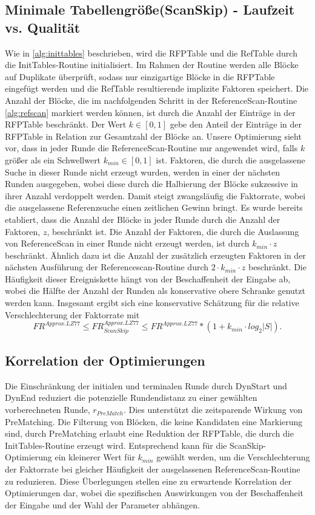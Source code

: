 \subsection{Minimale Tabellengröße(ScanSkip) - Laufzeit vs. Qualität}
Wie in \ref{alg:inittables} beschrieben, wird die RFPTable und die RefTable durch die InitTables-Routine initialisiert. Im Rahmen der Routine werden alle Blöcke auf Duplikate
überprüft, sodass nur einzigartige Blöcke in die RFPTable eingefügt werden und die RefTable resultierende implizite Faktoren speichert. Die Anzahl der Blöcke, die im nachfolgenden Schritt 
in der ReferenceScan-Routine \ref{alg:refscan} markiert werden können, ist durch die Anzahl der Einträge in der RFPTable beschränkt. Der Wert $k\in [0,1]$ gebe den Anteil der
Einträge in der RFPTable in Relation zur Gesamtzahl der Blöcke an. Unsere Optimierung sieht vor, dass in jeder Runde die ReferenceScan-Routine nur angewendet wird, falls $k$ größer
als ein Schwellwert $k_{min}\in [0,1]$ ist. Faktoren, die durch die ausgelassene Suche in dieser Runde nicht erzeugt wurden, werden in einer der nächsten Runden ausgegeben, wobei diese
durch die Halbierung der Blöcke sukzessive in ihrer Anzahl verdoppelt werden. Damit steigt zwangsläufig die Faktorrate, wobei die ausgelassene Referenzsuche einen zeitlichen Gewinn bringt.
Es wurde bereits etabliert, dass die Anzahl der Blöcke in jeder Runde durch die Anzahl der Faktoren, $z$, beschränkt ist. Die Anzahl der Faktoren, die durch die Auslassung von 
ReferenceScan in einer Runde nicht erzeugt werden, ist durch $k_{min} \cdot z$ beschränkt. Ähnlich dazu ist die Anzahl der zusätzlich erzeugten Faktoren in der nächsten Ausführung
der Referencescan-Routine durch $2 \cdot k_{min} \cdot z$ beschränkt. Die Häufigkeit dieser Ereigniskette hängt von der Beschaffenheit der Eingabe ab, wobei die Hälfte der Anzahl der
Runden als konservative obere Schranke genutzt werden kann. Insgesamt ergibt sich eine konservative Schätzung für die relative Verschlechterung der Faktorrate mit
\begin{equation}
    FR^{Approx.LZ77} \leq FR^{Approx.LZ77}_{ScanSkip} \leq FR^{Approx.LZ77} * (1 + k_{min} \cdot {log_2{|S|}}).
\end{equation}

\subsection{Korrelation der Optimierungen}
Die Einschränkung der initialen und terminalen Runde durch DynStart und DynEnd reduziert die potenzielle Rundendistanz zu einer gewählten vorberechneten Runde, $r_{PreMatch}$.
Dies unterstützt die zeitsparende Wirkung von PreMatching. Die Filterung von Blöcken, die keine Kandidaten eine Markierung sind, durch PreMatching erlaubt eine Reduktion der 
RFPTable, die durch die InitTables-Routine erzeugt wird. Entsprechend kann für die ScanSkip-Optimierung ein kleinerer Wert für $k_{min}$ gewählt werden, um die Verschlechterung
der Faktorrate bei gleicher Häufigkeit der ausgelassenen ReferenceScan-Routine zu reduzieren. Diese Überlegungen stellen eine zu erwartende Korrelation der Optimierungen dar,
wobei die spezifischen Auswirkungen von der Beschaffenheit der Eingabe und der Wahl der Parameter abhängen. 